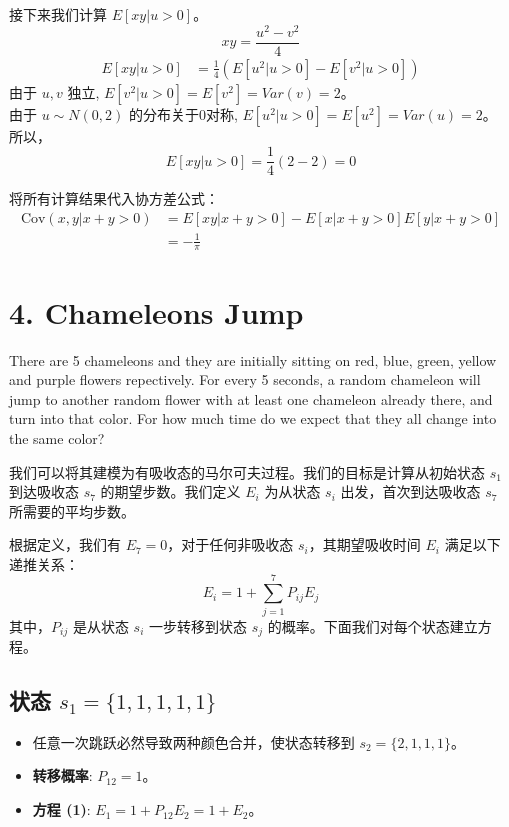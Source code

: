 \documentclass[UTF8]{ctexart}
\begin{document}
    接下来我们计算 $E[xy | u>0]$。
    \[ xy = \frac{u^2 - v^2}{4} \]
    \begin{align*}
    E[xy | u>0] 
    &= \frac{1}{4} (E[u^2 | u>0] - E[v^2 | u>0])
    \end{align*}
    由于 $u,v$ 独立, $E[v^2|u>0] = E[v^2] = Var(v) = 2$。\\
    由于 $u \sim N(0,2)$ 的分布关于0对称, $E[u^2 | u>0] = E[u^2] = Var(u) = 2$。\\
    所以，
    \[ E[xy | u>0] = \frac{1}{4} (2 - 2) = 0 \]

    将所有计算结果代入协方差公式：
    \begin{align*}
    \text{Cov}(x, y | x+y>0) &= E[xy | x+y>0] - E[x | x+y>0]E[y | x+y>0] \\
    &= - \frac{1}{\pi}
    \end{align*}


\section*{4. Chameleons Jump}

There are 5 chameleons and they are initially sitting on red, blue, green, yellow and purple flowers repectively. For every 5 seconds, a random chameleon will jump to another random flower with at least one chameleon already there, and turn into that color. For how much time do we expect that they all change into the same color?


我们可以将其建模为有吸收态的马尔可夫过程。我们的目标是计算从初始状态 $s_1$ 到达吸收态 $s_7$ 的期望步数。我们定义 $E_i$ 为从状态 $s_i$ 出发，首次到达吸收态 $s_7$ 所需要的平均步数。

根据定义，我们有 $E_7 = 0$，对于任何非吸收态 $s_i$，其期望吸收时间 $E_i$ 满足以下递推关系：
\[
E_i = 1 + \sum_{j=1}^{7} P_{ij} E_j
\]
其中，$P_{ij}$ 是从状态 $s_i$ 一步转移到状态 $s_j$ 的概率。下面我们对每个状态建立方程。

\subsection*{状态 $s_1 = \{1, 1, 1, 1, 1\}$}
\begin{itemize}
    \item 任意一次跳跃必然导致两种颜色合并，使状态转移到 $s_2 = \{2, 1, 1, 1\}$。
    \item \textbf{转移概率}: $P_{12} = 1$。
    \item \textbf{方程 (1)}: $E_1 = 1 + P_{12}E_2 = 1 + E_2$。
\end{itemize}
\end{document}
